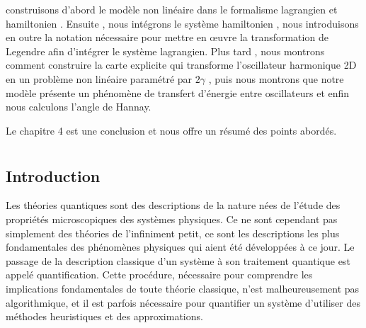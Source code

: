 \documentclass[12pt,a4paper, openany]{report}
\begin{document}
construisons d'abord le modèle non linéaire dans le formalisme lagrangien et hamiltonien . Ensuite , nous intégrons le système hamiltonien , nous introduisons en outre la notation nécessaire pour mettre en \oe{}uvre la transformation de Legendre afin d'intégrer le système lagrangien. Plus tard , nous montrons comment construire la carte explicite qui transforme l'oscillateur harmonique 2D en un problème non linéaire paramétré par $2\gamma$ , puis nous montrons que notre modèle présente un phénomène de transfert d'énergie entre oscillateurs et enfin nous calculons l'angle de Hannay.\par Le chapitre 4 est une conclusion et nous offre un résumé des points abordés.  
	
	\newpage
	\chapter{\color{green!30!blue}{La quantification canonique}}
	
	\section{Introduction} 
	Les théories quantiques sont des descriptions de la nature nées de l’étude des propriétés microscopiques des systèmes physiques. Ce ne sont cependant pas simplement des théories de l'infiniment petit, ce sont les descriptions les plus fondamentales des phénomènes physiques qui aient été développées à ce jour. Le passage de la description classique d’un système à son traitement quantique est appelé quantiﬁcation. Cette procédure, nécessaire pour comprendre les implications fondamentales de toute théorie classique, n'est malheureusement pas algorithmique, et il est parfois nécessaire pour quantifier un système d’utiliser des méthodes heuristiques et des approximations.
\end{document}
